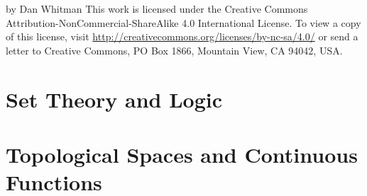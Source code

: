 \textcopyright{} \the\year{} by Dan Whitman
\newline
\newline
\def\liclink{http://creativecommons.org/licenses/by-nc-sa/4.0/}
This work is licensed under the Creative Commons Attribution-NonCommercial-ShareAlike 4.0 International License.
To view a copy of this license, visit \href{\liclink}{\liclink} or send a letter to Creative Commons, PO Box 1866, Mountain View, CA 94042, USA.

\begin{center}
  \ccbyncsa
\end{center}

\newpage
\tableofcontents

\newpage

\setcounter{page}{1} 

\begin{questions}

\newcommand\insec[1]{}

\section{Set Theory and Logic}
\insec{01}
\insec{02}
\insec{03}
\insec{04}
\insec{05}
\insec{06}
\insec{07}
\insec{08}
\insec{09}
\insec{10}
\insec{11}
\insec{11_WO}

\section{Topological Spaces and Continuous Functions}
\insec{13}
\insec{16}
\insec{17}
\insec{18}
\insec{19}
\insec{20}
\insec{21}
\insec{22}
\insec{22_TG}

\end{questions}

